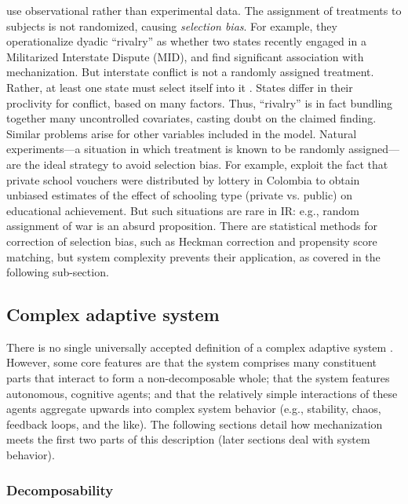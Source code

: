 \documentclass{article}
\begin{document}
\citet{sechser2010army} use observational rather than experimental
data. The assignment of treatments to subjects is not randomized, causing
\textit{selection bias}. For example, they operationalize
dyadic ``rivalry'' as whether two states recently engaged in a Militarized
Interstate Dispute (MID), and find significant association with mechanization. 
But interstate conflict is not a randomly assigned treatment. Rather, at least one state must select
itself into it \citep{fearon2002selection}. States differ in their
proclivity for conflict, based on many factors. 
Thus, ``rivalry'' is in fact
bundling together many uncontrolled covariates, casting doubt on the claimed
finding. Similar problems arise for other variables included in the model.
Natural experiments---a situation in which treatment is
known to be randomly assigned---are the ideal strategy to avoid selection bias. For
example, \citet{angrist2002vouchers} exploit the fact that private school
vouchers were distributed by lottery in Colombia to obtain unbiased estimates of
the effect of schooling type (private vs. public) on educational achievement.
But such situations are rare in IR: e.g., random assignment of war is an
absurd proposition. There are statistical methods for correction of selection
bias, such as Heckman correction and propensity score matching, but system
complexity prevents their application, as covered in the following sub-section.

\subsection{Complex adaptive system}

There is no single universally accepted definition of a complex adaptive system
\citep{miller2009complex}. However, some core features are
that the system comprises many constituent parts that interact to form a
non-decomposable whole; that the system features autonomous, cognitive
agents; and that the relatively simple interactions of these agents aggregate upwards into
complex system behavior (e.g., stability, chaos, feedback loops, and the like). 
The following sections detail how mechanization meets the first two parts of
this description (later sections deal with system behavior). 

\subsubsection{Decomposability}
\end{document}
